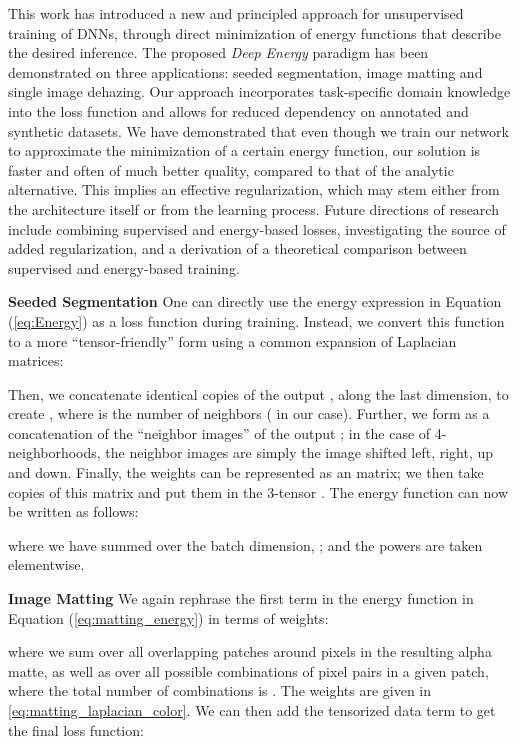 \documentclass[journal]{IEEEtran}
\newcommand{\smallpar}[1]{\textbf{#1}\hspace{0.2cm}}
\begin{document}
This work has introduced a new and principled approach for unsupervised training of DNNs, through direct minimization of energy functions that describe the desired inference. The proposed \emph{Deep Energy} paradigm has been demonstrated on three applications: seeded segmentation, image matting and single image dehazing. Our approach incorporates task-specific domain knowledge into the loss function and allows for reduced dependency on annotated and synthetic datasets. We have demonstrated that even though we train our network to approximate the minimization of a certain energy function, our solution is faster and often of much better quality, compared to that of the analytic alternative. This implies an effective regularization, which may stem either from the architecture itself or from the learning process. Future directions of research include combining supervised and energy-based losses, investigating the source of added regularization, and a derivation of a theoretical comparison between supervised and energy-based training.



 \label{s:appendix}
\smallpar{Seeded Segmentation} One can directly use the energy expression in Equation (\ref{eq:Energy}) as a loss function during training. Instead, we convert this function to a more ``tensor-friendly'' form using a common expansion of Laplacian matrices:

Then, we concatenate  identical copies of the output , along the last dimension, to create , where  is the number of neighbors ( in our case). Further, we form  as a concatenation of the  ``neighbor images'' of the output ; in the case of 4-neighborhoods,  the neighbor images are simply the image  shifted left, right, up and down. Finally, the weights can be represented as an  matrix; we then take  copies of this matrix and put them in the 3-tensor . The energy function can now be written as follows:

where we have summed over the batch dimension, ; and the powers are taken elementwise.


\smallpar{Image Matting} We again rephrase the first term in the energy function in Equation (\ref{eq:matting_energy}) in terms of weights:

where we sum over all overlapping patches around  pixels in the resulting alpha matte, as well as over all possible combinations of pixel pairs  in a given  patch, where the total number of combinations is . The weights  are given in \ref{eq:matting_laplacian_color}. We can then add the tensorized data term to get the final loss function:
\end{document}
